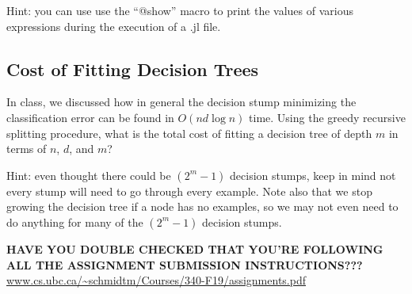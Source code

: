\documentclass{article}
\def\blu#1{{\color{blu}#1}}
\begin{document}
Hint: you can use use the ``@show'' macro to print the values of various expressions during the execution of a .jl file.

\subsection{Cost of Fitting Decision Trees}

In class, we discussed how in general the decision stump minimizing the classification error can be found in $O(nd\log n)$ time. Using the greedy recursive splitting procedure, \blu{what is the total cost of fitting a decision tree of depth $m$ in terms of $n$, $d$, and $m$?} 

Hint: even thought there could be $(2^m-1)$ decision stumps, keep in mind not every stump will need to go through every example. Note also that we stop growing the decision tree if a node has no examples, so we may not even need to do anything for many of the $(2^m-1)$ decision stumps.

\vspace{25pt}
\textbf{HAVE YOU DOUBLE CHECKED THAT YOU'RE FOLLOWING ALL THE ASSIGNMENT SUBMISSION INSTRUCTIONS???}\\
\url{www.cs.ubc.ca/~schmidtm/Courses/340-F19/assignments.pdf}
\end{document}
